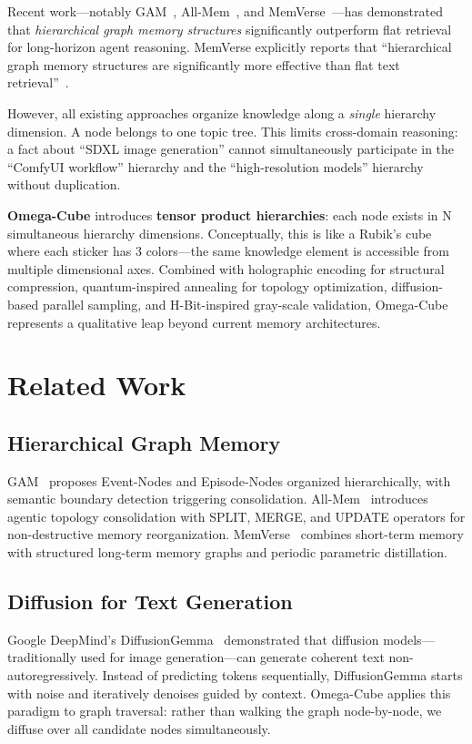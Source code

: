 \documentclass[11pt,a4paper]{article}
\begin{document}
Recent work---notably GAM~\cite{wu2026gam}, All-Mem~\cite{lv2026allmem}, and MemVerse~\cite{liu2026memverse}---has demonstrated that \textit{hierarchical graph memory structures} significantly outperform flat retrieval for long-horizon agent reasoning. MemVerse explicitly reports that ``hierarchical graph memory structures are significantly more effective than flat text retrieval''~\cite{liu2026memverse}.

However, all existing approaches organize knowledge along a \textit{single} hierarchy dimension. A node belongs to one topic tree. This limits cross-domain reasoning: a fact about ``SDXL image generation'' cannot simultaneously participate in the ``ComfyUI workflow'' hierarchy and the ``high-resolution models'' hierarchy without duplication.

\textbf{Omega-Cube} introduces \textbf{tensor product hierarchies}: each node exists in N simultaneous hierarchy dimensions. Conceptually, this is like a Rubik's cube where each sticker has 3 colors---the same knowledge element is accessible from multiple dimensional axes. Combined with holographic encoding for structural compression, quantum-inspired annealing for topology optimization, diffusion-based parallel sampling, and H-Bit-inspired gray-scale validation, Omega-Cube represents a qualitative leap beyond current memory architectures.

\section{Related Work}

\subsection{Hierarchical Graph Memory}
GAM~\cite{wu2026gam} proposes Event-Nodes and Episode-Nodes organized hierarchically, with semantic boundary detection triggering consolidation. All-Mem~\cite{lv2026allmem} introduces agentic topology consolidation with SPLIT, MERGE, and UPDATE operators for non-destructive memory reorganization. MemVerse~\cite{liu2026memverse} combines short-term memory with structured long-term memory graphs and periodic parametric distillation.

\subsection{Diffusion for Text Generation}
Google DeepMind's DiffusionGemma~\cite{diffusiongemma2026} demonstrated that diffusion models---traditionally used for image generation---can generate coherent text non-autoregressively. Instead of predicting tokens sequentially, DiffusionGemma starts with noise and iteratively denoises guided by context. Omega-Cube applies this paradigm to graph traversal: rather than walking the graph node-by-node, we diffuse over all candidate nodes simultaneously.
\end{document}
